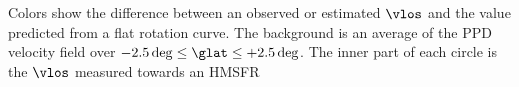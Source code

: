 \label{fig:maser_pie}
Colors show the difference between an observed or estimated $\vlos$ and the value predicted from a flat rotation curve. The background is an average of the PPD velocity field over $-2.5\deg \leq \glat \leq +2.5\deg$. The inner part of each circle is the $\vlos$ measured towards an HMSFR